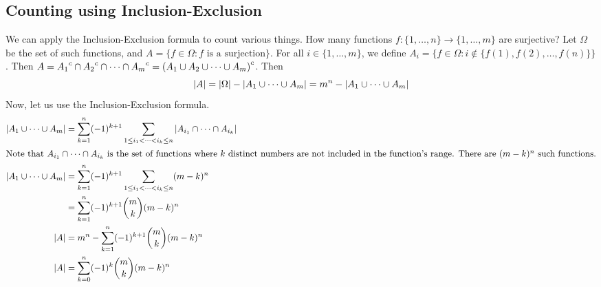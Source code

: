 \subsection{Counting using Inclusion-Exclusion}
We can apply the Inclusion-Exclusion formula to count various things.
How many functions \(f \colon \{ 1, \dots, n \} \to \{ 1, \dots, m \}\) are surjective? Let \(\Omega\) be the set of such functions, and \(A = \{ f \in \Omega : f \text{ is a surjection} \}\).
For all \(i \in \{ 1, \dots, m \}\), we define \(A_i = \{ f \in \Omega : i \notin \{ f(1), f(2), \dots, f(n) \} \}\).
Then \(A = {A_1}^c \cap {A_2}^c \cap \dots \cap {A_m}^c = {(A_1 \cup A_2 \cup \dots \cup A_m)}^c\).
Then
\[
	\abs{A} = \abs{\Omega} - \abs{A_1 \cup \dots \cup A_m} = m^n - \abs{A_1 \cup \dots \cup A_m}
\]
Now, let us use the Inclusion-Exclusion formula.
\begin{align*}
	\abs{A_1 \cup \dots \cup A_m} & = \sum_{k=1}^n (-1)^{k+1} \sum_{1 \leq i_1 < \dots < i_k \leq n} \abs{A_{i_1} \cap \dots \cap A_{i_k}} \\
	\intertext{Note that \(A_{i_1} \cap \dots \cap A_{i_k}\) is the set of functions where \(k\) distinct numbers are not included in the function's range.
		There are \((m-k)^n\) such functions.}
	\abs{A_1 \cup \dots \cup A_m} & = \sum_{k=1}^n (-1)^{k+1} \sum_{1 \leq i_1 < \dots < i_k \leq n} (m-k)^n                               \\
	                              & = \sum_{k=1}^n (-1)^{k+1} \binom{m}{k} (m-k)^n                                                         \\
	\abs{A}                       & = m^n -  \sum_{k=1}^n (-1)^{k+1} \binom{m}{k} (m-k)^n                                                  \\
	\abs{A}                       & = \sum_{k=0}^n (-1)^k \binom{m}{k} (m-k)^n
\end{align*}
